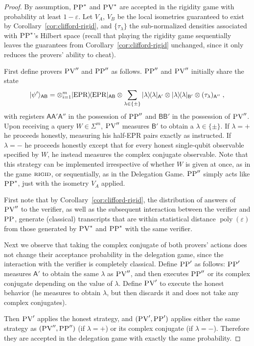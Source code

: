 \documentclass[11pt]{article}
\theoremstyle{remark}
\theoremstyle{definition}
\newcommand{\ket}[1]{|#1\rangle}
\newcommand{\bra}[1]{\langle#1|}
\newcommand{\proj}[1]{\ket{#1}\!\bra{#1}}
\DeclareMathOperator{\poly}{poly}
\newcommand{\reg}[1]{{\textsf{#1}}}
\newcommand{\eps}{\varepsilon}
\newcommand{\EPR}{{\rm EPR}}
\newcommand{\rigid}{\textsc{rigid}}
\newcommand{\pv}{\textsc{PV}}
\newcommand{\pp}{\textsc{PP}}
\begin{document}
\begin{proof}
By assumption, $\pp^*$ and $\pv^*$ are accepted in the rigidity game with probability at least $1-\eps$. Let $V_A$, $V_B$ be the local isometries guaranteed to exist by Corollary~\ref{cor:clifford-rigid}, and $\{\tau_\lambda\}$ the sub-normalized densities associated with $\pp^*$'s Hilbert space (recall that playing the rigidity game sequentially leaves the guarantees from Corollary~\ref{cor:clifford-rigid} unchanged, since it only reduces the provers' ability to cheat).

First define provers $\pv''$ and $\pp''$ as follows. $\pp''$ and $\pv''$ initially share the state 
$$\ket{\psi'}_{\reg{AB}} = \otimes_{i=1}^{m} \proj{\EPR}_{\reg{AB}} \otimes \sum_{\lambda\in\{\pm\}}  \proj{\lambda}_{\reg{A}'}\otimes \proj{\lambda}_{\reg{B}'}\otimes (\tau_\lambda)_{\reg{A}''}\;,$$
with registers $\reg{A}\reg{A}'\reg{A}''$ in the possession of $\pp''$ and $\reg{BB}'$ in the possession of $\pv''$. 
Upon receiving a query $W\in \Sigma^m$, $\pv''$ measures $\reg{B}'$ to obtain a $\lambda\in\{\pm\}$. If $\lambda=+$ he proceeds honestly, measuring his half-EPR pairs exactly as instructed. If $\lambda=-$ he proceeds honestly except that for every honest single-qubit observable specified by $W$, he instead measures the complex conjugate observable. Note that this strategy can be implemented irrespective of whether $W$ is given at once, as in the game $\rigid$, or sequentially, as in the Delegation Game. $\pp''$ simply acts like $\pp^*$, just with the isometry $V_A$ applied. 

First note that by Corollary~\ref{cor:clifford-rigid}, the distribution of answers of $\pv''$ to the verifier, as well as the subsequent interaction between the verifier and $\pp$, generate (classical) transcripts that are within statistical distance $\poly(\eps)$ from those generated by $\pv^*$ and $\pp^*$ with the same verifier. 

Next we observe that taking the complex conjugate of both provers' actions does not change their acceptance probability in the delegation game, since the interaction with the verifier is completely classical. Define $\pp'$ as follows: $\pp'$ measures $\reg{A}'$ to obtain the same $\lambda$ as $\pv''$, and then executes $\pp''$ or its complex conjugate depending on the value of $\lambda$. Define $\pv'$ to execute the honest behavior (he measures to obtain $\lambda$, but then discards it and does not take any complex conjugates). 

Then $\pv'$ applies the honest strategy, and $(\pv',\pp')$ applies either the same strategy as $(\pv'',\pp'')$ (if $\lambda=+$) or its complex conjugate (if $\lambda=-$). Therefore they are accepted in the delegation game with exactly the same probability. 
\end{proof}
\end{document}
